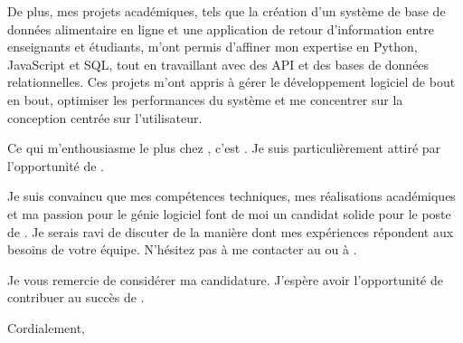 \documentclass[10pt]{article}
\begin{document}
De plus, mes projets académiques, tels que la création d'un système de base de données alimentaire en ligne et une application de retour d'information entre enseignants et étudiants, m'ont permis d'affiner mon expertise en Python, JavaScript et SQL, tout en travaillant avec des API et des bases de données relationnelles. Ces projets m'ont appris à gérer le développement logiciel de bout en bout, optimiser les performances du système et me concentrer sur la conception centrée sur l'utilisateur.

Ce qui m'enthousiasme le plus chez \company, c'est \companyDetails. Je suis particulièrement attiré par l'opportunité de \positionDetails.

Je suis convaincu que mes compétences techniques, mes réalisations académiques et ma passion pour le génie logiciel font de moi un candidat solide pour le poste de \position. Je serais ravi de discuter de la manière dont mes expériences répondent aux besoins de votre équipe. N'hésitez pas à me contacter au \href{tel:+15149445977}{\phone} ou à \href{mailto:\email}{\email}.

\vspace{1.5em}
Je vous remercie de considérer ma candidature. J'espère avoir l'opportunité de contribuer au succès de \company.

\vspace{2em}
Cordialement, \\
\fullname
\end{document}
